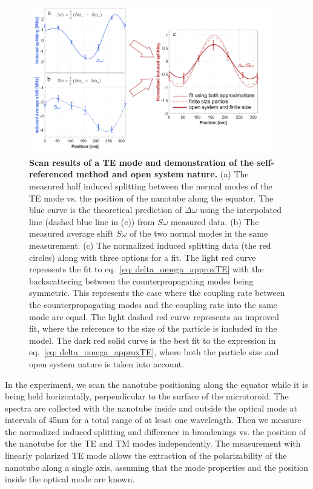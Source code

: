 \documentclass[journal=jacsat,manuscript=article]{achemso}
\begin{document}
\begin{figure}[H]
\centering
   \includegraphics[width=0.95\textwidth]{Images/data_plot_19_TE_forPaper_subplot1C.png}
        \caption{\textbf{Scan results of a TE mode and demonstration of the self-referenced method and open system nature.} (a) The measured half induced splitting between the normal modes of the TE mode vs. the position of the nanotube along the equator. The blue curve is the theoretical prediction of $\Delta \omega$ using the interpolated line (dashed blue line in (c)) from $\textit{S}\omega$ measured data. (b) The measured average shift $\textit{S}\omega$ of the two normal modes in the same measurement. (c) The normalized induced splitting data (the red circles) along with three options for a fit. The light red curve represents the fit to eq.~\ref{eq: delta_omega_approxTE} with the backscattering between the counterpropagating modes being symmetric. This represents the case where the coupling rate between the counterpropagating modes and the coupling rate into the same mode are equal. The light dashed red curve represents an improved fit, where the reference to the size of the particle is included in the model. The dark red solid curve is the best fit to the expression in eq.~\ref{eq: delta_omega_approxTE}, where both the particle size and open system nature is taken into account.}
\label{fig:TE_set19_splitting}
\end{figure}

In the experiment, we scan the nanotube positioning along the equator while it is being held horizontally, perpendicular to the surface of the microtoroid. The spectra are collected with the nanotube inside and outside the optical mode at intervals of 45nm for a total range of at least one wavelength. Then we measure the normalized induced splitting and difference in broadenings vs. the position of the nanotube for the TE and TM modes independently. The measurement with linearly polarized TE mode allows the extraction of the polarizability of the nanotube along a single axis, assuming that the mode properties and the position inside the optical mode are known.
\end{document}
